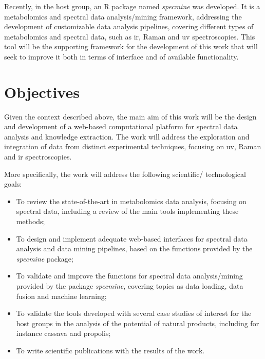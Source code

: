 Recently, in the host group, an R package named \textit{specmine} \citep{costa2016r} was developed. It is a metabolomics and spectral data analysis/mining framework, addressing the development of customizable data analysis pipelines, covering different types of metabolomics and spectral data, such as \gls{ir}, Raman and \gls{uv} spectroscopies. This tool will be the supporting framework for the development of this work that will seek to improve it both in terms of interface and of available functionality.


\section{Objectives}

Given the context described above, the main aim of this work will be the design and development of a web-based computational platform for spectral data analysis and knowledge extraction. The work will address the exploration and integration of data from distinct experimental techniques, focusing on \gls{uv}, Raman and \gls{ir} spectroscopies. 

More specifically, the work will address the following scientific/ technological goals:

\begin{itemize}
	\item To review the state-of-the-art in metabolomics data analysis, focusing on spectral data, including a review of the main tools implementing these methods;
	\item To design and implement adequate web-based interfaces for spectral data analysis and data mining pipelines, based on the functions provided by the \textit{specmine} package;
	\item To validate and improve the functions for spectral data analysis/mining provided by the package \textit{specmine}, covering topics as data loading, data fusion and machine learning;
	\item To validate the tools developed with several case studies of interest for the host groups in the analysis of the potential of natural products, including for instance cassava and propolis;
	\item To write scientific publications with the results of the work.
\end{itemize}


